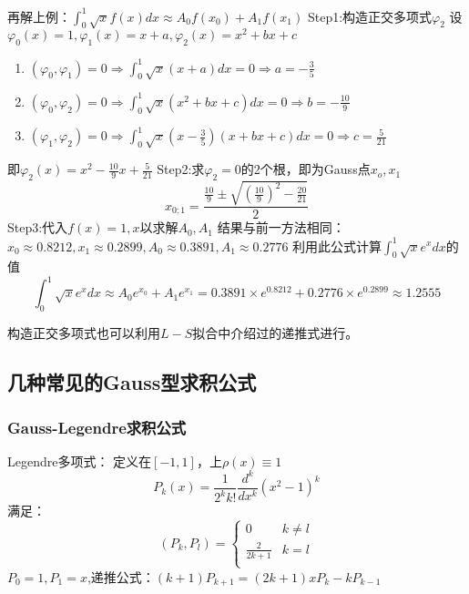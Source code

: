 \begin{example}
    再解上例：$\int_{0}^{1}\sqrt{x}f(x)dx \approx A_0f(x_0)+A_1f(x_1)$
    Step1:构造正交多项式$\varphi_2$
    设$\varphi_0(x) = 1,\varphi_1(x) = x+a,\varphi_2(x) = x^2+bx+c$
    \begin{enumerate}
        \item $(\varphi_0,\varphi_1) = 0 \Rightarrow \int_{0}^{1}\sqrt{x}(x+a)dx = 0 \Rightarrow a=-\frac{3}{5}$
        \item $(\varphi_0,\varphi_2) = 0 \Rightarrow \int_{0}^{1}\sqrt{x}(x^2+bx+c)dx = 0 \Rightarrow b = -\frac{10}{9}$
        \item $(\varphi_1,\varphi_2) = 0 \Rightarrow \int_{0}^{1}\sqrt{x}(x-\frac{3}{5})(x+bx+c)dx = 0 \Rightarrow c = \frac{5}{21}$
    \end{enumerate}
    即$\varphi_2(x) = x^2-\frac{10}{9}x+\frac{5}{21}$
    Step2:求$\varphi_2 = 0$的2个根，即为Gauss点$x_o,x_1$
    \begin{equation*}
        x_{0;1} = \frac{\frac{10}{9}\pm \sqrt{(\frac{10}{9})^2-\frac{20}{21}}}{2}
    \end{equation*}
    Step3:代入$f(x) = 1,x$以求解$A_0,A_1$
    结果与前一方法相同：$x_0 \approx 0.8212,x_1 \approx 0.2899,A_0 \approx 0.3891,A_1 \approx 0.2776$
    利用此公式计算$\int_{0}^{1}\sqrt{x}e^xdx$的值
    \begin{equation*}
        \int_{0}^{1}\sqrt{x}e^xdx \approx A_0e^{x_0} + A_1e^{x_1} = 0.3891 \times e^{0.8212} + 0.2776 \times e^{0.2899} \approx 1.2555
    \end{equation*}
    \begin{remark}
        构造正交多项式也可以利用$L-S$拟合中介绍过的递推式进行。
    \end{remark}
\end{example}

\subsection{几种常见的Gauss型求积公式}

\subsubsection{Gauss-Legendre求积公式}

Legendre多项式：
定义在$[-1,1]$，上$\rho(x)\equiv 1$
\begin{equation*}
    P_k(x) = \frac{1}{2^kk!}\frac{d^k}{dx^k}(x^2-1)^k
\end{equation*}
满足：
\[ (P_k,P_l) = 
\begin{cases}
    0& k\neq l \\
    \frac{2}{2k+1}& k=l\\
\end{cases}\]
$P_0 = 1,P_1 = x$,递推公式：$(k+1)P_{k+1} = (2k+1)xP_k-kP_{k-1}$

